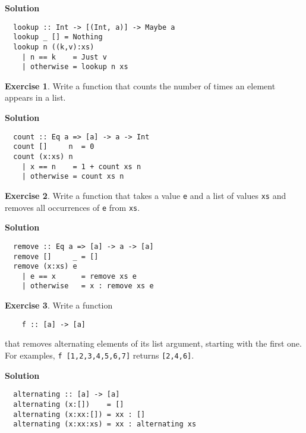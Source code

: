 \documentclass[11pt,a4paper]{article}
\theoremstyle{definition}
\newtheorem{exr}{Exercise}
\begin{document}
\textbf{Solution}
\begin{lstlisting}
  lookup :: Int -> [(Int, a)] -> Maybe a
  lookup _ [] = Nothing
  lookup n ((k,v):xs)
    | n == k    = Just v
    | otherwise = lookup n xs
\end{lstlisting}


\vspace{5mm}

\begin{exr}
  Write a function that counts the number of times an element appears in a list.
\end{exr}

\textbf{Solution}
\begin{lstlisting}
  count :: Eq a => [a] -> a -> Int
  count []     n  = 0
  count (x:xs) n
    | x == n    = 1 + count xs n
    | otherwise = count xs n
\end{lstlisting}


\vspace{5mm}

\begin{exr}
  Write a function that takes a value \texttt{e} and a list of values \texttt{xs}
  and removes all occurrences of \texttt{e} from \texttt{xs}.
\end{exr}

\textbf{Solution}
\begin{lstlisting}
  remove :: Eq a => [a] -> a -> [a]
  remove []     _ = []
  remove (x:xs) e
    | e == x      = remove xs e
    | otherwise   = x : remove xs e
\end{lstlisting}


\vspace{5mm}

\begin{exr}
  Write a function 
  
  \begin{lstlisting}
    f :: [a] -> [a]
  \end{lstlisting}

  that removes alternating elements of its list argument, starting with 
  the first one. For examples, \texttt{f [1,2,3,4,5,6,7]} returns 
  \texttt{[2,4,6]}.
\end{exr}

\textbf{Solution}
\begin{lstlisting}
  alternating :: [a] -> [a]
  alternating (x:[])    = []
  alternating (x:xx:[]) = xx : []
  alternating (x:xx:xs) = xx : alternating xs
\end{lstlisting}
\end{document}
